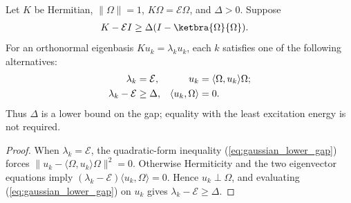 \begin{theorem}
    \label{thm:gaussian_gap_dichotomy}
    \leanok
    Let $K$ be Hermitian, $\|\Omega\|=1$, $K\Omega=\mathcal E\Omega$,
    and $\Delta>0$. Suppose
    \begin{align}
        K-\mathcal E I&\ge\Delta(I-\ketbra{\Omega}{\Omega}).
        \label{eq:gaussian_lower_gap}
    \end{align}
    For an orthonormal eigenbasis $Ku_k=\lambda_ku_k$, each $k$
    satisfies one of the following alternatives:
    \begin{align}
        \lambda_k&=\mathcal E, &
        u_k&=\langle\Omega,u_k\rangle\Omega;
        \label{eq:gaussian_eigenvector_cases}\\
        \lambda_k-\mathcal E&\ge\Delta, &
        \langle u_k,\Omega\rangle&=0. \notag
    \end{align}
    Thus $\Delta$ is a lower bound on the gap; equality with the least
    excitation energy is not required.
\end{theorem}
\begin{proof}\leanok
    When $\lambda_k=\mathcal E$, the quadratic-form inequality
    (\ref{eq:gaussian_lower_gap}) forces
    $\|u_k-\langle\Omega,u_k\rangle\Omega\|^2=0$.
    Otherwise Hermiticity and the two eigenvector equations imply
    $(\lambda_k-\mathcal E)\langle u_k,\Omega\rangle=0$.
    Hence $u_k\perp\Omega$, and evaluating
    (\ref{eq:gaussian_lower_gap}) on $u_k$ gives
    $\lambda_k-\mathcal E\ge\Delta$.
\end{proof}

